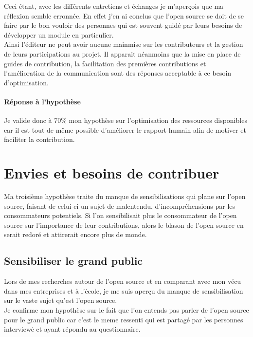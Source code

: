 		Ceci étant, avec les différents entretiens et échanges je m'aperçois que ma réflexion semble erronnée.
		En effet j'en ai conclus que l'open source se doit de se faire par le bon vouloir des personnes qui est souvent guidé par leurs besoins de développer un module en particulier.\\

		Ainsi l'éditeur ne peut avoir aucune mainmise sur les contributeurs et la gestion de leurs participations au projet.
		Il apparait néanmoins que la mise en place de guides de contribution, la facilitation des premières contributions et l'amélioration de la communication sont des réponses acceptable à ce besoin d'optimisation. 

\paragraph{Réponse à l'hypothèse\\}
	
	Je valide donc à 70\% mon hypothèse sur l'optimisation des ressources disponibles car il est tout de même possible d'améliorer le rapport humain afin de motiver et faciliter la contribution.

\section{Envies et besoins de contribuer}

	Ma troisième hypothèse traite du manque de sensibilisations qui plane sur l'open source, faisant de celui-ci un sujet de malentendu, d'incompréhensions par les consommateurs potentiels. Si l'on sensibilisait plus le consommateur de l'open source sur l'importance de leur contributions, alors le blason de l'open source en serait redoré et attirerait encore plus de monde.

	\subsection{Sensibiliser le grand public}

		Lors de mes recherches autour de l'open source et en comparant avec mon vécu dans mes entreprises et à l'école, je me suis aperçu du manque de sensibilisation sur le vaste sujet qu'est l'open source.\\

		Je confirme mon hypothèse sur le fait que l'on entends pas parler de l'open source pour le grand public car c'est le meme ressenti qui est partagé par les personnes interviewé et ayant répondu au questionnaire.\\


